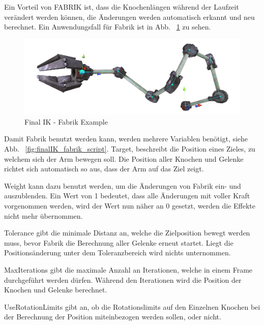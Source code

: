 Ein Vorteil von FABRIK ist, dass die Knochenlängen während der Laufzeit verändert werden können,
die Änderungen werden automatisch erkannt und neu berechnet. Ein Anwendungsfall für Fabrik ist in Abb. ~\ref{fig:finalIK_fabrik_example} zu sehen.
\begin {figure}
    \centering
    \includegraphics[scale=0.4]{pics/finalik_fabrik_pose}
    \caption{Final IK - Fabrik Example}
    \label{fig:finalIK_fabrik_example}
\end {figure}

Damit Fabrik benutzt werden kann, werden mehrere Variablen benötigt, siehe Abb. ~\ref{fig:finalIK_fabrik_script}.
Target, beschreibt die Position eines Zieles, zu welchem sich der Arm bewegen soll.
Die Position aller Knochen und Gelenke richtet sich automatisch so aus, dass der Arm auf das Ziel zeigt.

Weight kann dazu benutzt werden, um die Änderungen von Fabrik ein- und auszublenden. Ein Wert von 1 bedeutet,
dass alle Änderungen mit voller Kraft vorgenommen werden, wird der Wert nun näher an 0 gesetzt,
werden die Effekte nicht mehr übernommen.

Tolerance gibt die minimale Distanz an, welche die Zielposition bewegt werden muss,
bevor Fabrik die Berechnung aller Gelenke erneut startet. Liegt die Positionsänderung unter dem
Toleranzbereich wird nichts unternommen.

MaxIterations gibt die maximale Anzahl an Iterationen, welche in einem Frame durchgeführt werden dürfen.
Während den Iterationen wird die Position der Knochen und Gelenke berechnet.

UseRotationLimits gibt an, ob die Rotationslimits auf den Einzelnen Knochen bei der Berechnung der Position
miteinbezogen werden sollen, oder nicht.

